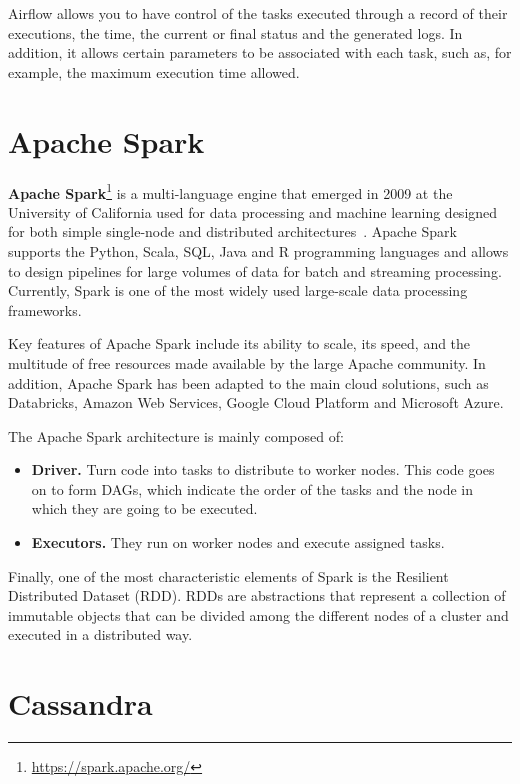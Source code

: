 \nonzeroparskip Airflow allows you to have control of the tasks executed through a record of their executions, the time, the current or final status and the generated logs. In addition, it allows certain parameters to be associated with each task, such as, for example, the maximum execution time allowed.

\section{Apache Spark}

\nonzeroparskip \textbf{Apache Spark}\footnote{\url{https://spark.apache.org/}} is a multi-language engine that emerged in 2009 at the University of California used for data processing and machine learning designed for both simple single-node and distributed architectures~\cite{infoworld_spark}. Apache Spark supports the Python, Scala, SQL, Java and R programming languages and allows to design pipelines for large volumes of data for batch and streaming processing. Currently, Spark is one of the most widely used large-scale data processing frameworks.

\nonzeroparskip Key features of Apache Spark include its ability to scale, its speed, and the multitude of free resources made available by the large Apache community. In addition, Apache Spark has been adapted to the main cloud solutions, such as Databricks, Amazon Web Services, Google Cloud Platform and Microsoft Azure.

\nonzeroparskip The Apache Spark architecture is mainly composed of:
\begin{itemize}
	\item \textbf{Driver.} Turn code into tasks to distribute to worker nodes. This code goes on to form DAGs, which indicate the order of the tasks and the node in which they are going to be executed.
	\item \textbf{Executors.} They run on worker nodes and execute assigned tasks.
\end{itemize}

\nonzeroparskip Finally, one of the most characteristic elements of Spark is the Resilient Distributed Dataset (RDD). RDDs are abstractions that represent a collection of immutable objects that can be divided among the different nodes of a cluster and executed in a distributed way.

\section{Cassandra}

